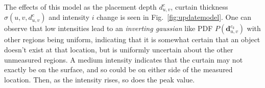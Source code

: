 The effects of this model as the placement depth $d^c_{u, v}$, curtain thickness $\sigma(u, v, d^c_{u, v})$ and intensity $i$ change is seen in Fig.~\ref{fig:updatemodel}. One can observe that low intensities lead to an \textit{inverting gaussian} like PDF $P\left(\mathbf{d}_{u,v}^{c_{k}}\right)$ with other regions being uniform, indicating that it is somewhat certain that an object doesn't exist at that location, but is uniformly uncertain about the other unmeasured regions. A medium intensity indicates that the curtain may not exactly be on the surface, and so could be on either side of the measured location. Then, as the intensity rises, so does the peak value.